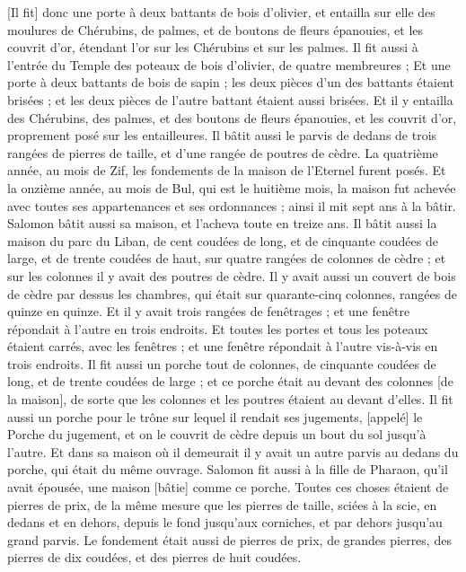 \begin{multicols}{2}
[Il fit] donc une porte à deux battants de bois d'olivier, et entailla sur elle des moulures de Chérubins, de palmes, et de boutons de fleurs épanouies, et les couvrit d'or, étendant l'or sur les Chérubins et sur les palmes.
Il fit aussi à l'entrée du Temple des poteaux de bois d'olivier, de quatre membreures ;
Et une porte à deux battants de bois de sapin ; les deux pièces d'un des battants étaient brisées ; et les deux pièces de l'autre battant étaient aussi brisées.
Et il y entailla des Chérubins, des palmes, et des boutons de fleurs épanouies, et les couvrit d'or, proprement posé sur les entailleures.
Il bâtit aussi le parvis de dedans de trois rangées de pierres de taille, et d'une rangée de poutres de cèdre.
La quatrième année, au mois de Zif, les fondements de la maison de l'Eternel furent posés.
Et la onzième année, au mois de Bul, qui est le huitième mois, la maison fut achevée avec toutes ses appartenances et ses ordonnances ; ainsi il mit sept ans à la bâtir.
\VerseOne{}Salomon bâtit aussi sa maison, et l'acheva toute en treize ans.
Il bâtit aussi la maison du parc du Liban, de cent coudées de long, et de cinquante coudées de large, et de trente coudées de haut, sur quatre rangées de colonnes de cèdre ; et sur les colonnes il y avait des poutres de cèdre.
Il y avait aussi un couvert de bois de cèdre par dessus les chambres, qui était sur quarante-cinq colonnes, rangées de quinze en quinze.
Et il y avait trois rangées de fenêtrages ; et une fenêtre répondait à l'autre en trois endroits.
Et toutes les portes et tous les poteaux étaient carrés, avec les fenêtres ; et une fenêtre répondait à l'autre vis-à-vis en trois endroits.
Il fit aussi un porche tout de colonnes, de cinquante coudées de long, et de trente coudées de large ; et ce porche était au devant des colonnes [de la maison], de sorte que les colonnes et les poutres étaient au devant d'elles.
Il fit aussi un porche pour le trône sur lequel il rendait ses jugements, [appelé] le Porche du jugement, et on le couvrit de cèdre depuis un bout du sol jusqu'à l'autre.
Et dans sa maison où il demeurait il y avait un autre parvis au dedans du porche, qui était du même ouvrage. Salomon fit aussi à la fille de Pharaon, qu'il avait épousée, une maison [bâtie] comme ce porche.
Toutes ces choses étaient de pierres de prix, de la même mesure que les pierres de taille, sciées à la scie, en dedans et en dehors, depuis le fond jusqu'aux corniches, et par dehors jusqu'au grand parvis.
Le fondement était aussi de pierres de prix, de grandes pierres, des pierres de dix coudées, et des pierres de huit coudées.

\end{multicols}
